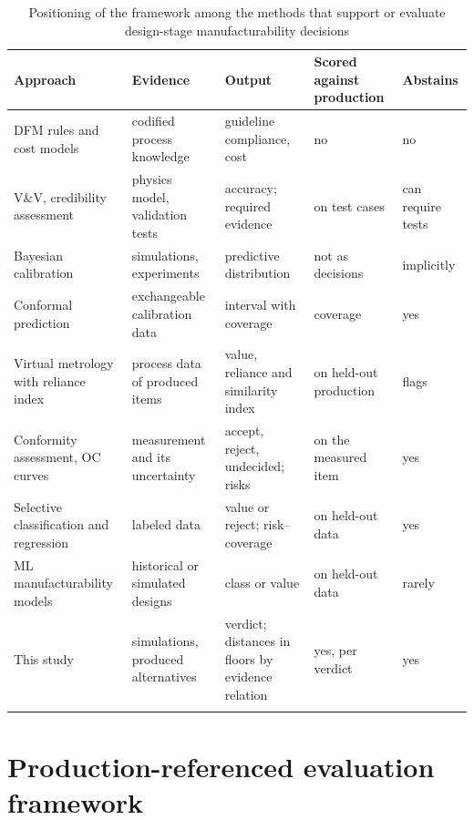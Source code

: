 \documentclass[pdflatex,sn-basic,lineno]{sn-jnl}
\newcommand{\tabsize}{\fontsize{8}{9.5}\selectfont}
\begin{document}
\begin{table}[t]
\tabsize
\setlength{\tabcolsep}{3.5pt}
\caption{Positioning of the framework among the methods that support or evaluate design-stage manufacturability decisions}\label{tab:positioning}
\begin{tabular}{@{}L{3.2cm}L{2.5cm}L{2.9cm}L{1.9cm}L{1.5cm}@{}}
\toprule
Approach & Evidence & Output & Scored against production & Abstains \\
\midrule
DFM rules and cost models \citep{boothroyd2010product} & codified process knowledge & guideline compliance, cost & no & no \\
V\&V, credibility assessment \citep{oberkampf2010verification, asme2018assessing} & physics model, validation tests & accuracy; required evidence & on test cases & can require tests \\
Bayesian calibration \citep{kennedy2001bayesian} & simulations, experiments & predictive distribution & not as decisions & implicitly \\
Conformal prediction \citep{lei2018distribution} & exchangeable calibration data & interval with coverage & coverage & yes \\
Virtual metrology with reliance index \citep{cheng2008evaluating} & process data of produced items & value, reliance and similarity index & on held-out production & flags \\
Conformity assessment, OC curves \citep{iso2017decision, bechhofer1954single} & measurement and its uncertainty & accept, reject, undecided; risks & on the measured item & yes \\
Selective classification and regression \citep{chow1970optimum, zaoui2020regression} & labeled data & value or reject; risk--coverage & on held-out data & yes \\
ML manufacturability models \citep{ghadai2018learning, yan2026machine} & historical or simulated designs & class or value & on held-out data & rarely \\
This study & simulations, produced alternatives & verdict; distances in floors by evidence relation & yes, per verdict & yes \\
\botrule
\end{tabular}
\end{table}

\section{Production-referenced evaluation framework}\label{sec:method}
\end{document}
